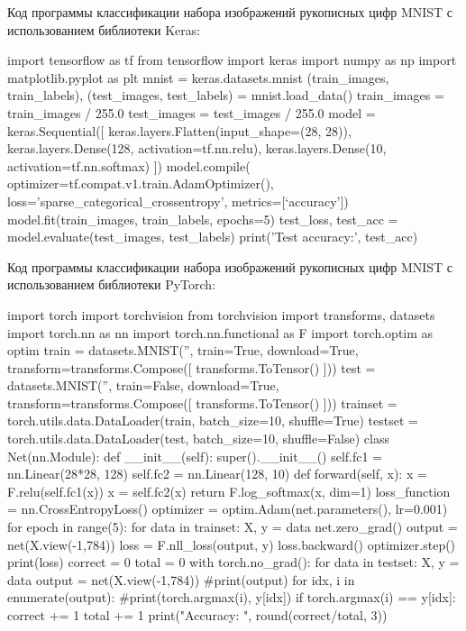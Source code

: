 \documentclass[a4paper]{article}
\begin{document}
Код программы классификации набора изображений рукописных цифр MNIST с использованием библиотеки Keras:
\begin{listing}{1}
import tensorflow as  tf
from tensorflow import keras
import numpy as np
import matplotlib.pyplot as plt
mnist = keras.datasets.mnist
(train_images, train_labels), (test_images, test_labels) = mnist.load_data()
train_images = train_images / 255.0 
test_images = test_images / 255.0 
model = keras.Sequential([
	keras.layers.Flatten(input_shape=(28, 28)), 
	keras.layers.Dense(128, activation=tf.nn.relu), 
	keras.layers.Dense(10, activation=tf.nn.softmax)
]) 
model.compile(
	optimizer=tf.compat.v1.train.AdamOptimizer(),
	loss='sparse_categorical_crossentropy',
	metrics=[‘accuracy']) 
model.fit(train_images, train_labels, epochs=5)
test_loss, test_acc = model.evaluate(test_images, test_labels) 
print('Test accuracy:', test_acc)
\end{listing}

Код программы классификации набора изображений рукописных цифр MNIST с использованием библиотеки PyTorch:
\begin{listing}{1}
import torch
import torchvision
from torchvision import transforms, datasets import torch.nn as nn
import torch.nn.functional as F
import torch.optim as optim
train = datasets.MNIST('', train=True, download=True, transform=transforms.Compose([
	transforms.ToTensor() ]))
test = datasets.MNIST('', train=False, download=True, transform=transforms.Compose([
	transforms.ToTensor() ]))
trainset = torch.utils.data.DataLoader(train, batch_size=10, shuffle=True)
testset = torch.utils.data.DataLoader(test, batch_size=10, shuffle=False)
class Net(nn.Module): 
	def __init__(self):
		super().__init__()
		self.fc1 = nn.Linear(28*28, 128) 
		self.fc2 = nn.Linear(128, 10)
	def forward(self, x):
		x = F.relu(self.fc1(x))
		x = self.fc2(x)
		return F.log_softmax(x, dim=1)
loss_function = nn.CrossEntropyLoss()
optimizer = optim.Adam(net.parameters(), lr=0.001) 
for epoch in range(5):
	for data in trainset: 
		X, y = data
		net.zero_grad()
		output = net(X.view(-1,784)) 
		loss = F.nll_loss(output, y) 
		loss.backward() 
		optimizer.step()
	print(loss)
correct = 0
total = 0
with torch.no_grad(): 
	for data in testset:
		X, y = data
		output = net(X.view(-1,784)) 
		#print(output)
		for idx, i in enumerate(output):
			#print(torch.argmax(i), y[idx]) 
			if torch.argmax(i) == y[idx]:
				correct += 1 
			total += 1
print("Accuracy: ", round(correct/total, 3))
\end{listing}
\end{document}

